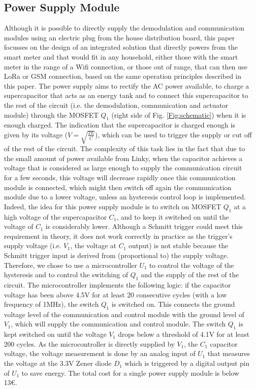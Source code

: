 \documentclass[conference]{IEEEtran}
\begin{document}
\subsection{Power Supply Module}
Although it is possible to directly supply the demodulation and communication modules using an electric plug from the house distribution board, this paper focusses on the design of an integrated solution that directly powers from the smart meter and that would fit in any household, either those with the smart meter in the range of a Wifi connection, or those out of range, that can then use LoRa or GSM connection, based on the same operation principles described in this paper. The power supply aims to rectify the AC power available, to charge a supercapacitor that acts as an energy tank and to connect this supercapacitor to the rest of the circuit (i.e. the demodulation, communication and actuator module) through the MOSFET $Q_1$ (right side of Fig. \ref{Fig:schematic}) when it is enough charged. The indication that the supercapacitor is charged enough is given by its voltage ($V=\sqrt{\frac{2E}{C}}$), which can be used to trigger the supply or cut off of the rest of the circuit.
 The complexity of this task  lies in the fact that due to the small amount of power available from Linky, when the capacitor achieves a voltage that is considered as large enough to supply the communication circuit for a few seconds, this voltage will decrease rapidly once this communication module is connected, which might then switch off again the communication module due to a lower voltage, unless an hysteresis control loop is implemented. Indeed, the idea for this power supply module is to switch on MOSFET $Q_1$ at a high voltage of the supercapacitor $C_1$, and to keep it switched on until the voltage of $C_1$ is considerably lower. Although a Schmitt trigger could meet this requirement in theory, it does not work correctly in practice as the trigger's supply voltage (i.e.  $V_1$, the voltage at $C_1$ output) is not stable because the Schmitt trigger input is derived from (proportional to) the supply voltage. Therefore, we chose to use a microcontroller $U_1$  to control the voltage of the hysteresis and to control the switching of  $Q_1$ and the supply of the rest of the circuit.  The microcontroller implements the following logic: if the capacitor voltage has been above 4.5V for at least  20 consecutive cycles (with a low frequency of 1MHz), the switch $Q_1$ is switched on. This connects the ground voltage level of the communication and control module with the ground level of  $V_1$, which will supply the communication and control module. The switch  $Q_1$ is kept switched on  until the voltage $V_1$ drops below a threshold of 4.1V for at least 200 cycles. As the microcontroller is directly supplied by $V_1$, the $C_1$ capacitor voltage, the voltage measurement is done by an analog input of $U_1$ that measures the voltage at the 3.3V Zener diode $D_1$ which is triggered by a digital output pin of $U_1$ to save energy. The total cost for a single  power supply module is below 13€. 
 
\end{document}
